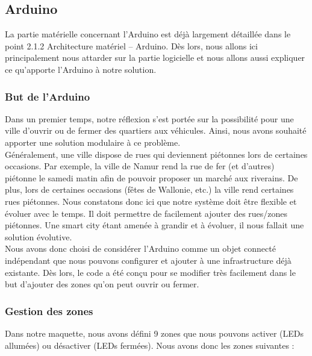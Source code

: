 \subsection{Arduino}
La partie matérielle concernant l’Arduino est déjà largement détaillée dans le point 2.1.2 Architecture matériel – Arduino. Dès lors, nous allons ici principalement nous attarder sur la partie logicielle et nous allons aussi expliquer ce qu’apporte l’Arduino à notre solution. 

\subsubsection{But de l'Arduino}
Dans un premier temps, notre réflexion s’est portée sur la possibilité pour une ville d’ouvrir ou de fermer des quartiers aux véhicules. Ainsi, nous avons souhaité apporter une solution modulaire à ce problème.\\

Généralement, une ville dispose de rues qui deviennent piétonnes lors de certaines occasions. Par exemple, la ville de Namur rend la rue de fer (et d’autres) piétonne le samedi matin afin de pouvoir proposer un marché aux riverains. De plus, lors de certaines occasions (fêtes de Wallonie, etc.) la ville rend certaines rues piétonnes. Nous constatons donc ici que notre système doit être flexible et évoluer avec le temps. Il doit permettre de facilement ajouter des rues/zones piétonnes. Une smart city étant amenée à grandir et à évoluer, il nous fallait une solution évolutive.\\

Nous avons donc choisi de considérer l’Arduino comme un objet connecté indépendant que nous pouvons configurer et ajouter à une infrastructure déjà existante. Dès lors, le code a été conçu pour se modifier très facilement dans le but d’ajouter des zones qu’on peut ouvrir ou fermer.

\subsubsection{Gestion des zones}
Dans notre maquette, nous avons défini 9 zones que nous pouvons activer (LEDs allumées) ou désactiver (LEDs fermées). Nous avons donc les zones suivantes : 

